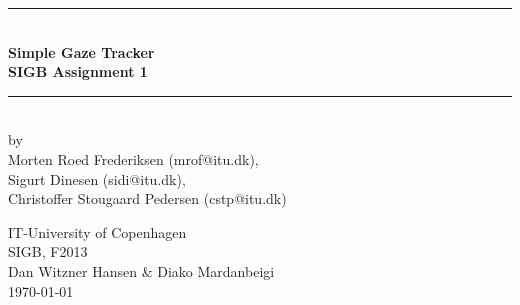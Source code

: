 \documentclass[]{article}
\begin{document}
\begin{titlepage}
\centering \parindent=0pt
\newcommand{\HRule}{\rule{\textwidth}{1mm}}
 \HRule\\[1cm]\Huge\bfseries
Simple Gaze Tracker\\[0.7cm]
\large SIGB Assignment 1\\[1cm]
\HRule\\[4cm]  
\large by 
\\Morten Roed Frederiksen (mrof@itu.dk),  
\\Sigurt Dinesen (sidi@itu.dk),
\\Christoffer Stougaard Pedersen (cstp@itu.dk)\\ 
 \normalsize %
\begin{flushleft}
IT-University of Copenhagen \\
SIGB, F2013\\
Dan Witzner Hansen \& Diako Mardanbeigi \\
\today \end{flushleft}
\end{titlepage}

\tableofcontents


\end{document}
